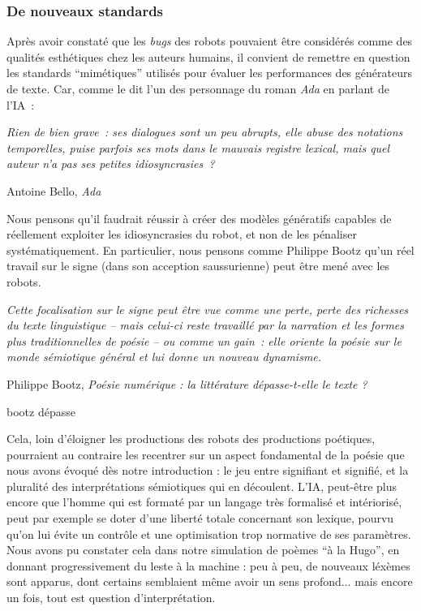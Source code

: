 \documentclass{article}
\newenvironment{citationbox}
{\begin{center}
		\begin{minipage}{.8\textwidth}
		}
		{
		\end{minipage}	
\end{center}
}
\begin{document}
			\subsubsection{De nouveaux standards}
				Après avoir constaté que les \textit{bugs} des robots pouvaient être considérés comme des qualités esthétiques chez les auteurs humains, il convient de remettre en question les standards ``mimétiques'' utilisés pour évaluer les performances des générateurs de texte. Car, comme le dit l'un des personnage du roman \textit{Ada} en parlant de l'IA~:
				\begin{citationbox}
					\textit{Rien de bien grave~: ses dialogues sont un peu abrupts, elle abuse des notations temporelles, puise parfois ses mots dans le mauvais registre lexical, mais quel auteur n'a pas ses petites idiosyncrasies~?}
					\begin{flushright}
						Antoine Bello, \textit{Ada} \cite{bello2016}
					\end{flushright}
				\end{citationbox}
				Nous pensons qu'il faudrait réussir à créer des modèles génératifs capables de réellement exploiter les idiosyncrasies du robot, et non de les pénaliser systématiquement. En particulier, nous pensons comme Philippe Bootz qu'un réel travail sur le signe (dans son acception saussurienne) peut être mené avec les robots.
				\begin{citationbox}
					\textit{Cette focalisation sur le signe peut être vue comme une perte, perte des richesses du
					texte linguistique -- mais celui-ci reste travaillé par la narration et les formes plus
					traditionnelles de poésie -- ou comme un gain~: elle oriente la poésie sur le monde sémiotique
					général et lui donne un nouveau dynamisme. }
					\begin{flushright}
						Philippe Bootz, \textit{Poésie numérique : la littérature dépasse-t-elle le
						texte ?} \cite{bootz2005}
					\end{flushright}
					bootz dépasse
				\end{citationbox}
				Cela, loin d'éloigner les productions des robots des productions poétiques, pourraient au contraire les recentrer sur un aspect fondamental de la poésie que nous avons évoqué dès notre introduction : le jeu entre signifiant et signifié, et la pluralité des interprétations sémiotiques qui en découlent. L'IA, peut-être plus encore que l'homme qui est formaté par un langage très formalisé et intériorisé, peut par exemple se doter d'une liberté totale concernant son lexique, pourvu qu'on lui évite un contrôle et une optimisation trop normative de ses paramètres. Nous avons pu constater cela dans notre simulation de poèmes ``à la Hugo'', en donnant progressivement du leste à la machine : peu à peu, de nouveaux léxèmes sont apparus, dont certains semblaient même avoir un sens profond... mais encore un fois, tout est question d'interprétation.\\
				
\end{document}
